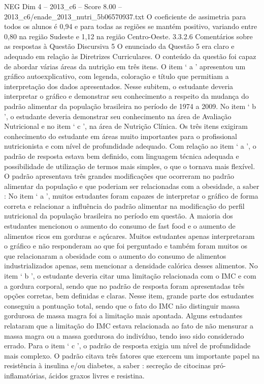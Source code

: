 \begin{textsample}{NEG Dim 4 – 2013\_c6 – Score 8.00 – 2013\_c6/enade\_2013\_nutri\_5b06570937.txt}
O coeficiente de assimetria para todos os alunos é 0,94 e para todas as regiões se mantém positivo, variando entre 0,80 na região Sudeste e 1,12 na região Centro-Oeste. 3.3.2.6 Comentários sobre as respostas à Questão Discursiva 5 O enunciado da Questão 5 era claro e adequado em relação às Diretrizes Curriculares.
O conteúdo da questão foi capaz de abordar várias áreas da nutrição em três itens.
O item ‘ a ’ apresentou um gráfico autoexplicativo, com legenda, coloração e título que permitiam a interpretação dos dados apresentados.
Nesse subitem, o estudante deveria interpretar o gráfico e demonstrar seu conhecimento a respeito da mudança do padrão alimentar da população brasileira no período de 1974 a 2009.
No item ‘ b ’, o estudante deveria demonstrar seu conhecimento na área de Avaliação Nutricional e no item ‘ c ’, na área de Nutrição Clínica.
Os três itens exigiram conhecimento do estudante em áreas muito importantes para o profissional nutricionista e com nível de profundidade adequado.
Com relação ao item ‘ a ’, o padrão de resposta estava bem definido, com linguagem técnica adequada e possibilidade de utilização de termos mais simples, o que o tornava mais flexível.
O padrão apresentava três grandes modificações que ocorreram no padrão alimentar da população e que poderiam ser relacionadas com a obesidade, a saber : No item ‘ a ’, muitos estudantes foram capazes de interpretar o gráfico de forma correta e relacionar a influência do padrão alimentar na modificação do perfil nutricional da população brasileira no período em questão.
A maioria dos estudantes mencionou o aumento do consumo de fast food e o aumento de alimentos ricos em gorduras e açúcares.
Muitos estudantes apenas interpretaram o gráfico e não responderam ao que foi perguntado e também foram muitos os que relacionaram a obesidade com o aumento do consumo de alimentos industrializados apenas, sem mencionar a densidade calórica desses alimentos.
No item ‘ b ’, o estudante deveria citar uma limitação relacionada com o IMC e com a gordura corporal, sendo que no padrão de resposta foram apresentadas três opções corretas, bem definidas e claras.
Nesse item, grande parte dos estudantes conseguiu a pontuação total, sendo que o fato do IMC não distinguir massa gordurosa de massa magra foi a limitação mais apontada.
Alguns estudantes relataram que a limitação do IMC estava relacionada ao fato de não mensurar a massa magra ou a massa gordurosa do indivíduo, tendo isso sido considerado errado.
Para o item ‘ c ’, o padrão de resposta exigia um nível de profundidade mais complexo.
O padrão citava três fatores que exercem um importante papel na resistência à insulina e/ou diabetes, a saber : secreção de citocinas pró-inflamatórias, ácidos graxos livres e resistina.

\end{textsample}
